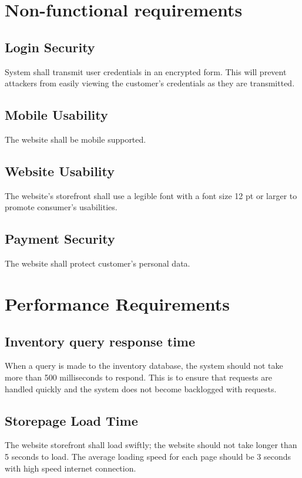 \documentclass{scrreprt}
\theoremstyle{funreq}
\begin{document}
	\section{Non-functional requirements}
	\subsection{Login Security}
	System shall transmit user credentials in an encrypted form.  This will prevent attackers from easily viewing the customer's credentials as they are transmitted.  
	
    \subsection{Mobile Usability}
	The website shall be mobile supported.

    \subsection{Website Usability}
    The website’s storefront shall use a legible font with a font size 12 pt or larger to promote consumer’s usabilities.

    \subsection{Payment Security}
    The website shall protect customer’s personal data.

	\section{Performance Requirements}
	\subsection{Inventory query response time}
	When a query is made to the inventory database, the system should not take more than 500 milliseconds to respond.  This is to ensure that requests are handled quickly and the system does not become backlogged with requests.
	
	\subsection{Storepage Load Time}
	The website storefront shall load swiftly; the website should not take longer than 5 seconds to load. The average loading speed for each page should be 3 seconds with high speed internet connection.
	
\end{document}

